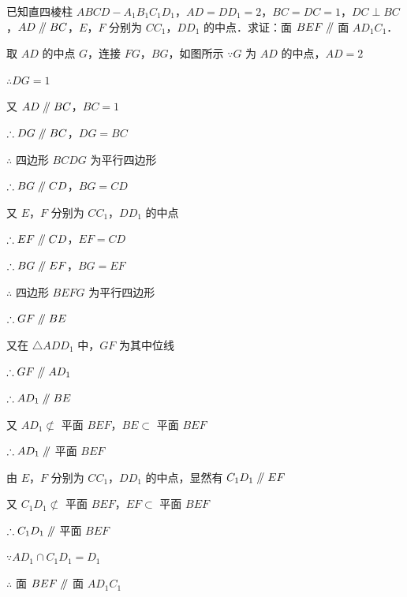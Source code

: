 \vspace{2em}


\begin{example}[\bkstar{3}{5}]
已知直四棱柱 $ABCD-A_1B_1C_1D_1$，$AD=DD_1=2$，$BC=DC=1$，$DC\perp BC$，$AD\mathrel{/\mkern-5mu/} BC$，$E$，$F$ 分别为 $CC_1$，$DD_1$ 的中点．求证：面 $BEF\mathrel{/\mkern-5mu/}$ 面 $AD_1C_1$．
\end{example}
\begin{solution}
取 $AD$ 的中点 $G$，连接 $FG$，$BG$，如图所示
$\because G$ 为 $AD$ 的中点，$AD=2$

$\therefore DG=1$

又 $AD\mathrel{/\mkern-5mu/} BC$，$BC=1$

$\therefore DG\mathrel{/\mkern-5mu/} BC$，$DG=BC$

$\therefore$ 四边形 $BCDG$ 为平行四边形

$\therefore BG\mathrel{/\mkern-5mu/} CD$，$BG=CD$

又 $E$，$F$ 分别为 $CC_1$，$DD_1$ 的中点

$\therefore EF\mathrel{/\mkern-5mu/} CD$，$EF=CD$

$\therefore BG\mathrel{/\mkern-5mu/} EF$，$BG=EF$

$\therefore$ 四边形 $BEFG$ 为平行四边形

$\therefore GF\mathrel{/\mkern-5mu/} BE$

又在 $\triangle ADD_1$ 中，$GF$ 为其中位线

$\therefore GF\mathrel{/\mkern-5mu/} AD_1$

$\therefore AD_1\mathrel{/\mkern-5mu/} BE$

又 $AD_1\not\subset$ 平面 $BEF$，$BE\subset$ 平面 $BEF$

$\therefore AD_1\mathrel{/\mkern-5mu/}$ 平面 $BEF$

由 $E$，$F$ 分别为 $CC_1$，$DD_1$ 的中点，显然有 $C_1D_1\mathrel{/\mkern-5mu/} EF$

又 $C_1D_1\not\subset$ 平面 $BEF$，$EF\subset$ 平面 $BEF$

$\therefore C_1D_1\mathrel{/\mkern-5mu/}$ 平面 $BEF$

$\because AD_1\cap C_1D_1=D_1$

$\therefore$ 面 $BEF\mathrel{/\mkern-5mu/}$ 面 $AD_1C_1$
\end{solution}

\vspace{2em}

